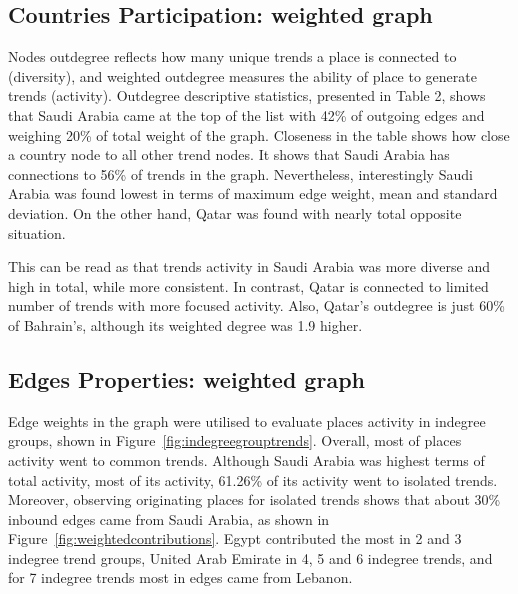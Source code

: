 \documentclass{llncs}
\begin{document}

\subsection{Countries Participation: weighted graph}

Nodes outdegree reflects how many unique trends a place is connected
to (diversity), and weighted outdegree measures the ability of place
to generate trends (activity). Outdegree descriptive statistics,
presented in Table 2, shows that Saudi Arabia came at the top of the
list with 42\% of outgoing edges and weighing 20\% of total weight of
the graph. Closeness in the table shows how close a country node to
all other trend nodes. It shows that Saudi Arabia has connections to
56\% of trends in the graph. Nevertheless, interestingly Saudi Arabia
was found lowest in terms of maximum edge weight, mean and standard
deviation. On the other hand, Qatar was found with nearly total
opposite situation.

This can be read as that trends activity in Saudi Arabia was more
diverse and high in total, while more consistent. In contrast, Qatar
is connected to limited number of trends with more focused
activity. Also, Qatar’s outdegree is just 60\% of Bahrain’s, although
its weighted degree was 1.9 higher. 


\subsection{Edges Properties: weighted graph}

Edge weights in the graph were utilised to evaluate places activity in
indegree groups, shown in
Figure~\ref{fig:indegreegrouptrends}. Overall, most of places activity
went to common trends. Although Saudi Arabia was highest terms of
total activity, most of its activity, 61.26\% of its activity went to
isolated trends. Moreover, observing originating places for isolated
trends shows that about 30\% inbound edges came from Saudi Arabia, as
shown in Figure~\ref{fig:weightedcontributions}. Egypt contributed the
most in 2 and 3 indegree trend groups, United Arab Emirate in 4, 5 and
6 indegree trends, and for 7 indegree trends most in edges came from
Lebanon.
\end{document}
